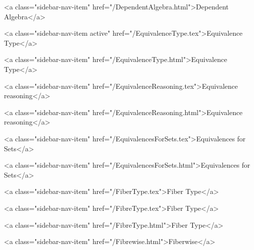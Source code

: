       
    
      
        
          <a class="sidebar-nav-item" href="/DependentAlgebra.html">Dependent Algebra</a>
        
      
    
      
        
          <a class="sidebar-nav-item active" href="/EquivalenceType.tex">Equivalence Type</a>
        
      
    
      
        
          <a class="sidebar-nav-item" href="/EquivalenceType.html">Equivalence Type</a>
        
      
    
      
        
          <a class="sidebar-nav-item" href="/EquivalenceReasoning.tex">Equivalence reasoning</a>
        
      
    
      
        
          <a class="sidebar-nav-item" href="/EquivalenceReasoning.html">Equivalence reasoning</a>
        
      
    
      
        
          <a class="sidebar-nav-item" href="/EquivalencesForSets.tex">Equivalences for Sets</a>
        
      
    
      
        
          <a class="sidebar-nav-item" href="/EquivalencesForSets.html">Equivalences for Sets</a>
        
      
    
      
        
          <a class="sidebar-nav-item" href="/FiberType.tex">Fiber Type</a>
        
      
    
      
        
          <a class="sidebar-nav-item" href="/FibreType.tex">Fiber Type</a>
        
      
    
      
        
          <a class="sidebar-nav-item" href="/FibreType.html">Fiber Type</a>
        
      
    
      
        
          <a class="sidebar-nav-item" href="/Fibrewise.html">Fiberwise</a>
        
